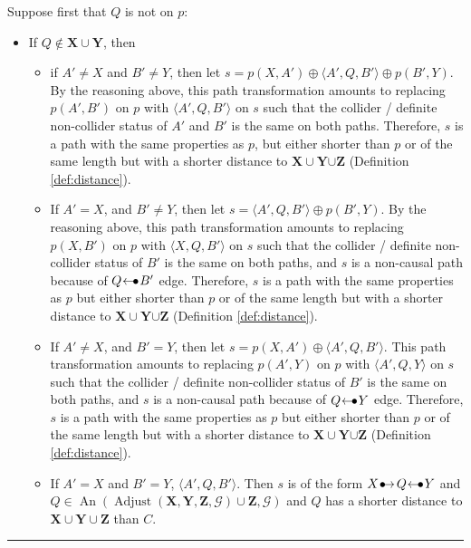 \documentclass[twoside]{article}
\DeclareMathOperator{\An}{An}
\DeclareMathOperator{\Adjust}{Adjust}
\newcommand{\adjustb}[2][X,Y,Z]{\Adjust(\mb{#1},#2)}
\newcommand{\mb}[1]{\mathbf{#1}}
\newcommand{\g}[1][G]{\mathcal{#1}}
\newenvironment{proofof}[1][]{\begin{trivlist}
\item[\hskip \labelsep {\bfseries Proof of #1.}]}{\hfill\BlackBox\end{trivlist}}
\newcommand{\BlackBox}{\rule{1.5ex}{1.5ex}}
\newcommand{\bulletarrow}{
  \setlength{\unitlength}{1mm}
  \begin{picture}(5,1)(0,0)
    \put(0.2,0){$\bullet$}
    \put(1,0){$\rightarrow$}
  \end{picture}
}
\newcommand{\arrowbullet}{
  \setlength{\unitlength}{1mm}
  \begin{picture}(5,1)(0,0)
    \put(0.2,0){$\leftarrow$}
    \put(3,0){$\bullet$}
  \end{picture}
}
\begin{document}
\begin{proofof}[Lemma \ref{lem:adjust-and-o-pag-helper}]
Suppose first that $Q$ is not on $p$:
    \begin{itemize}
        \item If $Q \notin \mb{X} \cup \mb{Y}$, then
        \begin{itemize}
            \item if $A' \neq X$ and $B' \neq Y$, then let $s = p(X,A') \oplus \langle A',Q,B' \rangle \oplus p(B',Y)$. By the reasoning above, this path transformation amounts to replacing $p(A',B')$ on $p$ with  $\langle A',Q,B' \rangle$ on $s$ such that the collider / definite non-collider status of $A'$ and $B'$ is the same on both paths. Therefore, $s$ is a path with the same properties as $p$, but either shorter than $p$ or of the same length but with a shorter distance to $\mb{X} \cup \mb{Y} {\cup \mb{Z}}$ (Definition \ref{def:distance}).
            \item If $A' = X$, and $B' \neq Y$, then let $s= \langle A',Q,B' \rangle \oplus p(B',Y)$. By the reasoning above, this path transformation amounts to replacing $p(X,B')$ on $p$ with  $\langle X,Q,B' \rangle$ on $s$ such that the collider / definite non-collider status of $B'$ is the same on both paths, and $s$ is a non-causal path because of $Q \arrowbullet B'$ edge. Therefore, $s$ is a path with the same properties as $p$ but either shorter than $p$ or of the same length but with a shorter distance to $\mb{X} \cup \mb{Y} {\cup \mb{Z}}$ (Definition \ref{def:distance}).
            \item If $A' \neq X$, and $B' = Y$, then let $s = p(X,A') \oplus \langle A',Q,B' \rangle$. This path transformation amounts to replacing $p(A',Y)$ on $p$ with  $\langle A',Q,Y \rangle$ on $s$ such that the collider / definite non-collider status of $B'$ is the same on both paths, and $s$ is a non-causal path because of $Q \arrowbullet Y$ edge. Therefore, $s$ is a path with the same properties as $p$ but either shorter than $p$ or of the same length but with a shorter distance to $\mb{X} \cup \mb{Y} {\cup \mb{Z}}$ (Definition \ref{def:distance}).
            \item If $A' = X$ and $B' = Y$, $\langle A',Q,B' \rangle$. Then $s$ is of the form $X \bulletarrow Q \arrowbullet Y$ and $Q \in \An(\adjustb{\g} \cup \mb{Z},\g)$ and $Q$ has a shorter distance to $\mb{X} \cup \mb{Y} \cup \mb{Z}$ than $C$.    
        \end{itemize}
        

\end{itemize}
\end{proofof}
\end{document}
